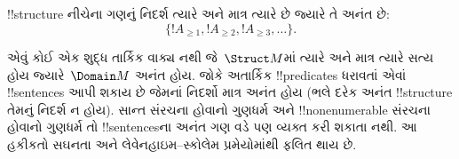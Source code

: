 \documentclass[../../../include/open-logic-section]{subfiles}
\begin{document}
\begin{prop}
!!{structure} નીચેના ગણનું નિદર્શ ત્યારે અને માત્ર ત્યારે છે જ્યારે
તે અનંત છે:
\[
\{!A_{\ge 1}, !A_{\ge 2}, !A_{\ge 3}, \dots \}.
\]
\end{prop}

એવું કોઈ એક શુદ્ધ તાર્કિક વાક્ય નથી જે~$\Struct M$માં ત્યારે અને માત્ર
ત્યારે સત્ય હોય જ્યારે~$\Domain M$ અનંત હોય. જોકે અતાર્કિક
!!{predicate}s ધરાવતાં એવાં !!{sentence}s આપી શકાય છે જેમનાં નિદર્શો
માત્ર અનંત હોય (ભલે દરેક અનંત !!{structure} તેમનું નિદર્શ ન હોય).
સાન્ત સંરચના હોવાનો ગુણધર્મ અને !!{nonenumerable} સંરચના હોવાનો ગુણધર્મ તો
!!{sentence}sના અનંત ગણ વડે પણ વ્યક્ત કરી શકાતા નથી. આ હકીકતો સઘનતા
અને લેવેનહાઇમ--સ્કોલેમ પ્રમેયોમાંથી ફલિત થાય છે.
\end{document}
